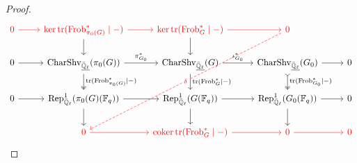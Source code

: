 \begin{proof}
                        $$
                            \begin{tikzcd}
                            	{\textcolor{red}{0}} & {\textcolor{red}{\ker \trace(\Frob_{\pi_0(G)}^* \mid -)}} & {\textcolor{red}{\ker \trace(\Frob_G^* \mid -)}} & {\textcolor{red}{0}} \\
                            	0 & {\Char\Shv_{\underline{\bar{\Q}_{\ell}}}(\pi_0(G))} & {\Char\Shv_{\underline{\bar{\Q}_{\ell}}}(G)} & {\Char\Shv_{\underline{\bar{\Q}_{\ell}}}(G_0)} & 0 \\
                            	0 & {\Rep^1_{\bar{\Q}_{\ell}}(\pi_0(G)(\F_q))} & {\Rep^1_{\bar{\Q}_{\ell}}(G(\F_q))} & {\Rep^1_{\bar{\Q}_{\ell}}(G_0(\F_q))} & 0 \\
                            	& {\textcolor{red}{0}} & {\textcolor{red}{\coker \trace(\Frob_G^* \mid -)}} & {\textcolor{red}{0}} & {\textcolor{red}{0}}
                            	\arrow[from=2-1, to=2-2]
                            	\arrow["{\pi_{G_0}^*}", from=2-2, to=2-3]
                            	\arrow["{\iota_{G_0}^*}", from=2-3, to=2-4]
                            	\arrow[from=2-4, to=2-5]
                            	\arrow[from=3-1, to=3-2]
                            	\arrow[from=3-2, to=3-3]
                            	\arrow[from=3-3, to=3-4]
                            	\arrow[from=3-4, to=3-5]
                            	\arrow["{\trace(\Frob_{\pi_0(G)}^* \mid -)}", two heads, from=2-2, to=3-2]
                            	\arrow["{\trace(\Frob_G^* \mid -)}", from=2-3, to=3-3]
                            	\arrow["{\trace(\Frob_{G_0}^* \mid -)}", tail, two heads, from=2-4, to=3-4]
                            	\arrow[from=1-2, to=2-2]
                            	\arrow[from=1-3, to=2-3]
                            	\arrow[color={red}, from=1-1, to=1-2]
                            	\arrow[color={red}, from=1-2, to=1-3]
                            	\arrow[color={red}, from=1-3, to=1-4]
                            	\arrow[from=3-3, to=4-3]
                            	\arrow[from=3-2, to=4-2]
                            	\arrow[from=3-4, to=4-4]
                            	\arrow["\delta"{description}, color={red}, dashed, from=1-4, to=4-2]
                            	\arrow[color={red}, from=4-2, to=4-3]
                            	\arrow[color={red}, from=4-3, to=4-4]
                            	\arrow[color={red}, from=4-4, to=4-5]
                            \end{tikzcd}
                        $$
                \end{proof}
        
